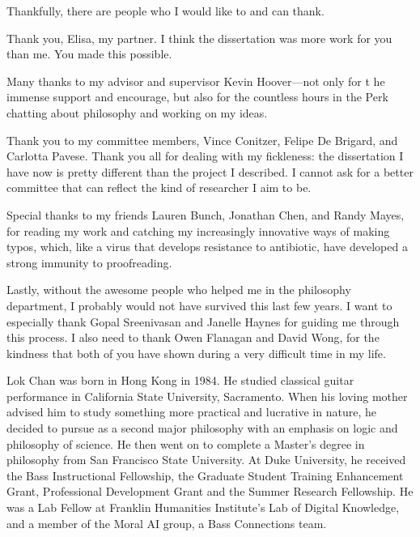 \documentclass[PhD]{dukethesis2006}
\begin{document}
Thankfully, there are people who I would like to and can thank.

Thank you, Elisa, my partner. I think the dissertation was more work for you than me. You made this possible. 

Many thanks to my advisor and supervisor Kevin Hoover---not only for t he immense support and encourage, but also for the countless hours in the Perk chatting about philosophy and working on my ideas. 

Thank you to my committee members, Vince Conitzer, Felipe De Brigard, and Carlotta Pavese. Thank you all for dealing with my fickleness: the dissertation I have now is pretty different than the project I described. I cannot ask for a better committee that can reflect the kind of researcher I aim to be. 

Special thanks to my friends Lauren Bunch, Jonathan Chen, and Randy Mayes, for reading my work and catching my increasingly innovative ways of making typos, which, like a virus that develops resistance to antibiotic, have developed a strong immunity to proofreading.

Lastly, without the awesome people who helped me in the philosophy department, I probably would not have survived this last few years. I want to especially thank Gopal Sreenivasan and Janelle Haynes for guiding me through this process. I also need to thank Owen Flanagan and David Wong, for the kindness that both of you have shown during a very difficult time in my life. 









\printbibliography[heading=bibintoc]

\biography

	Lok Chan was born in Hong Kong in 1984. He studied classical guitar performance in California State University, Sacramento. When his loving mother advised him to study something more practical and lucrative in nature, he decided to pursue as a second major philosophy with an emphasis on logic and philosophy of science. He then went on to complete a Master's degree in philosophy from San Francisco State University. At Duke University, he received the Bass Instructional Fellowship, the Graduate Student Training Enhancement Grant, Professional Development Grant and the Summer Research Fellowship. He was a Lab Fellow at Franklin Humanities Institute's Lab of Digital Knowledge, and a member of the Moral AI group, a Bass Connections team.
\end{document}
